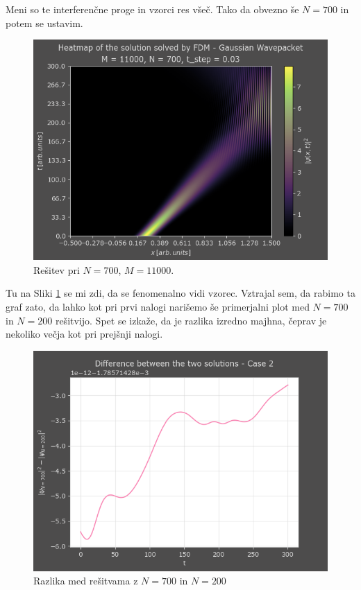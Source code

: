 \documentclass[a4paper]{article}
\begin{document}
Meni so te interferenčne proge in vzorci res všeč. Tako da obvezno še $N=700$ in potem se ustavim. 

\begin{figure}[p]
    \centering
    \includegraphics[width=\textwidth]{./images/case2_N700.png}
    \caption{Rešitev pri $N=700$, $M=11000$.}
    \label{fig:gaussian_N700}
\end{figure}

Tu na Sliki \ref{fig:gaussian_N700} se mi zdi, da se fenomenalno vidi vzorec. 
Vztrajal sem, da rabimo ta graf zato, da lahko kot pri  prvi nalogi narišemo še primerjalni plot 
med $N=700$ in $N=200$ rešitvijo. Spet se izkaže, da je razlika izredno majhna, čeprav je nekoliko 
večja kot pri prejšnji nalogi.

\begin{figure}[p]
    \centering
    \includegraphics[width=\textwidth]{./images/delta_case2.png}
    \caption{Razlika med rešitvama z $N=700$ in $N=200$}
\end{figure}
\end{document}
